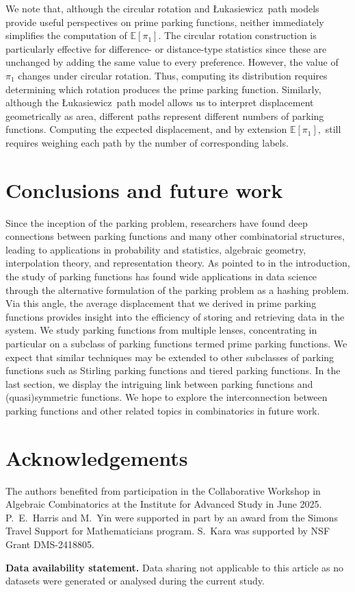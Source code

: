 \documentclass[12pt,reqno]{amsart}
\theoremstyle{definition}
\newcommand{\E}{\mathbb{E}}
\theoremstyle{remark}
\newcommand{\Luka}{\L ukasiewicz}
\begin{document}
We note that, although the circular rotation and \Luka~path models provide useful perspectives on prime parking functions, neither immediately simplifies the computation of $\E[\pi_1]$. The circular rotation construction is particularly effective for difference- or distance-type statistics since these are unchanged by adding the same value to every preference. However, the value of $\pi_1$ changes under circular rotation. Thus, computing its distribution requires determining which rotation produces the prime parking function. Similarly, although the \Luka~path model allows us to interpret displacement geometrically as area, different paths represent different numbers of parking functions. Computing the expected displacement, and by extension $\E[\pi_1],$ still requires weighing each path by the number of corresponding labels.


\section{Conclusions and future work}\label{sec: conclusions}
Since the inception of the parking problem, researchers have found deep connections between parking
functions and many other combinatorial structures, leading to applications in probability and statistics, algebraic geometry, interpolation theory, and representation theory. As pointed to in the introduction, the study of parking functions has found wide applications in data science through the alternative formulation of the parking problem as a hashing problem. Via this angle, the average displacement that we derived in prime parking functions provides insight into the efficiency of storing and retrieving data in the system. We study parking functions from multiple lenses, concentrating in particular on a subclass of parking functions termed prime parking functions. We expect that similar techniques may be extended to other subclasses of parking functions such as Stirling parking functions and tiered parking functions. In the last section, we display the intriguing link between parking functions and (quasi)symmetric functions. We hope to explore the interconnection between parking functions
and other related topics in combinatorics in future work.

\section*{Acknowledgements}
The authors benefited from participation in the Collaborative Workshop in Algebraic Combinatorics at the Institute for Advanced Study in June 2025.
P.~E.~Harris and M.~Yin were supported in part by an award from the Simons Travel Support for Mathematicians program. S.~Kara was supported by NSF Grant DMS-2418805. 


\textbf{Data availability statement.} Data sharing not applicable to this article as no datasets were generated or analysed during the current study.




\end{document}
